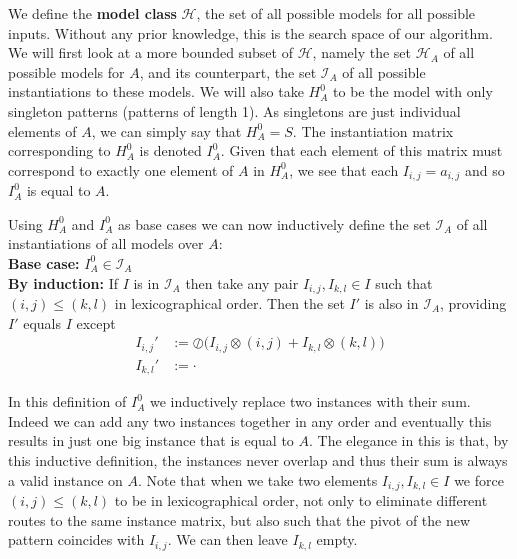 \documentclass{llncs}
\begin{document}
We define the \textbf{model class} $\mathcal{H}$, the set of all possible models for all possible inputs. Without any prior knowledge, this is the search space of our algorithm. We will first look at a more bounded subset of $\mathcal{H}$, namely the set $\mathcal{H}_A$ of all possible models for $A$, and its counterpart, the set $\mathcal{I}_A$ of all possible instantiations to these models. We will also take $H_A^0$ to be the model with only singleton patterns (patterns of length 1). As singletons are just individual elements of $A$, we can simply say that $H_A^0=S$. The instantiation matrix corresponding to $H_A^0$ is denoted ${I}_A^0$. Given that each element of this matrix must correspond to exactly one element of $A$ in $H_A^0$, we see that each ${I}_{i,j} = a_{i,j}$ and so ${I}_A^0$ is equal to $A$. 

Using $H_A^0$ and ${I}_A^0$ as base cases we can now inductively define the set $\mathcal{I}_A$ of all instantiations of all models over $A$:\\
\textbf{Base case:} ${I}_A^0 \in \mathcal{I}_A$\\
\textbf{By induction:} If ${I}$ is in $\mathcal{I}_A$ then take any pair ${I}_{i,j},{I}_{k,l} \in {I}$ such that $(i,j)\leq(k,l)$ in lexicographical order. Then the set ${I}'$ is also in $\mathcal{I}_A$, providing ${I}'$ equals ${I}$ except
\begin{align*}
{I}_{i,j}' &:= \oslash \big( {I}_{i,j} \otimes (i,j) + {I}_{k,l} \otimes (k,l) \big) \\
{I}_{k,l}' &:= \cdot %
\end{align*}

In this definition of ${I}_A^0$ we inductively replace two instances with their sum. Indeed we can add any two instances together in any order and eventually this results in just one big instance that is equal to $A$. The elegance in this is that, by this inductive definition, the instances never overlap and thus their sum is always a valid instance on $A$. Note that when we take two elements ${I}_{i,j},{I}_{k,l} \in {I}$ we force $(i,j)\leq(k,l)$ to be in lexicographical order, not only to eliminate different routes to the same instance matrix, but also such that the pivot of the new pattern coincides with ${I}_{i,j}$. We can then leave ${I}_{k,l}$ empty.
\end{document}
